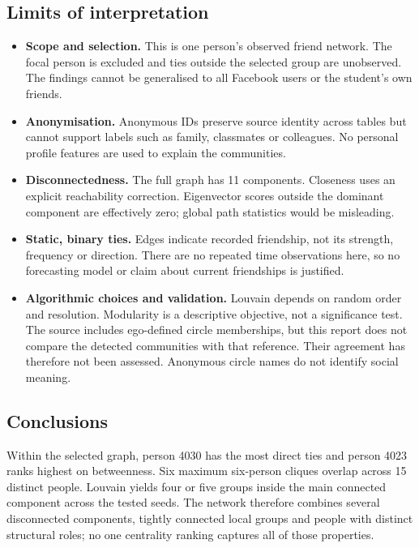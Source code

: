 \documentclass[11pt,a4paper]{article}
\begin{document}
\subsection{Limits of interpretation}
\begin{itemize}
\item \textbf{Scope and selection.} This is one person's observed friend network.
The focal person is excluded and ties outside the selected group are unobserved.
The findings cannot be generalised to all Facebook users or the student's own friends.
\item \textbf{Anonymisation.} Anonymous IDs preserve source identity across
tables but cannot support labels such as family, classmates or colleagues.
No personal profile features are used to explain the communities.
\item \textbf{Disconnectedness.} The full graph has 11 components. Closeness uses
an explicit reachability correction. Eigenvector scores outside the dominant
component are effectively zero; global path statistics would be misleading.
\item \textbf{Static, binary ties.} Edges indicate recorded friendship, not its
strength, frequency or direction. There are no repeated time observations here,
so no forecasting model or claim about current friendships is justified.
\item \textbf{Algorithmic choices and validation.} Louvain depends on random
order and resolution. Modularity is a descriptive objective, not a significance
test. The source includes ego-defined circle memberships, but this report does
not compare the detected communities with that reference. Their agreement has
therefore not been assessed. Anonymous circle names do not identify social meaning.
\end{itemize}

\subsection{Conclusions}
Within the selected graph, person 4030 has the most direct ties and person 4023
ranks highest on betweenness. Six maximum six-person cliques overlap across
15 distinct people. Louvain yields four or five groups inside the main connected
component across the tested seeds. The network therefore combines several
disconnected components, tightly connected local groups and people with distinct
structural roles; no one centrality ranking captures all of those properties.

\clearpage
\end{document}
